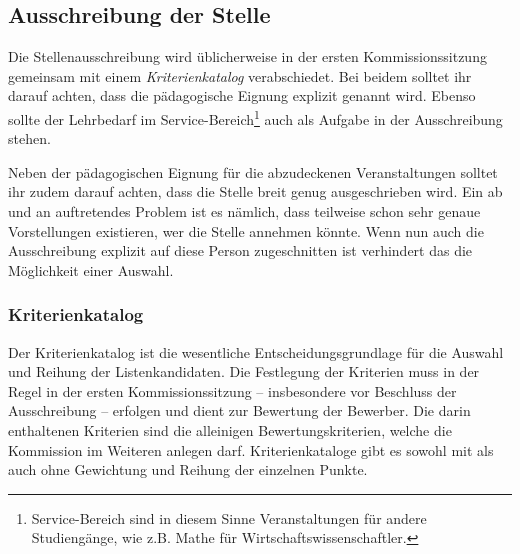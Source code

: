


\subsection{Ausschreibung der Stelle}
Die Stellenausschreibung wird üblicherweise in der ersten Kommissionssitzung gemeinsam mit einem \emph{Kriterienkatalog} verabschiedet. Bei beidem solltet ihr darauf achten, dass die pädagogische Eignung explizit genannt wird. Ebenso sollte der Lehrbedarf im Service-Bereich\footnote{Service-Bereich sind in diesem Sinne Veranstaltungen für andere Studiengänge, wie z.B. Mathe für Wirtschaftswissenschaftler.} auch als Aufgabe in der Ausschreibung stehen.

Neben der pädagogischen Eignung für die abzudeckenen Veranstaltungen solltet ihr zudem darauf achten, dass die Stelle breit genug ausgeschrieben wird. Ein ab und an auftretendes Problem ist es nämlich, dass teilweise schon sehr genaue Vorstellungen existieren, wer die Stelle annehmen könnte. Wenn nun auch die Ausschreibung explizit auf diese Person zugeschnitten ist verhindert das die Möglichkeit einer Auswahl.

\subsubsection*{Kriterienkatalog}\label{kriterienkatalog}
Der Kriterienkatalog ist die wesentliche Entscheidungsgrundlage für die Auswahl und Reihung der Listenkandidaten. Die Festlegung der Kriterien muss in der Regel in der ersten Kommissionssitzung -- insbesondere vor Beschluss der Ausschreibung -- erfolgen und dient zur Bewertung der Bewerber. Die darin enthaltenen Kriterien sind die alleinigen Bewertungskriterien, welche die Kommission im Weiteren anlegen darf. Kriterienkataloge gibt es sowohl mit als auch ohne Gewichtung und Reihung der einzelnen Punkte.

